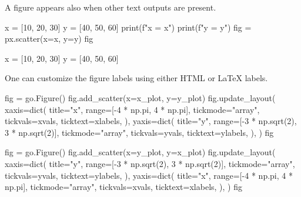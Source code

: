 \documentclass[oneside]{book}
\begin{document}
\begin{mdcell}
A figure appears also when other text outputs are present.
\end{mdcell}

\begin{pycell}
x = [10, 20, 30]
y = [40, 50, 60]
print(f"x = {x}")
print(f"y = {y}")
fig = px.scatter(x=x, y=y)
fig
\end{pycell}
\begin{pyexpectedoutput}
x = [10, 20, 30]
y = [40, 50, 60]
\end{pyexpectedoutput}

\begin{mdcell}
One can customize the figure labels using either HTML or LaTeX labels.
\end{mdcell}


\begin{pycell}
fig = go.Figure()
fig.add_scatter(x=x_plot, y=y_plot)
fig.update_layout(
    xaxis=dict(
        title="x",
        range=[-4 * np.pi, 4 * np.pi],
        tickmode="array",
        tickvals=xvals,
        ticktext=xlabels,
    ),
    yaxis=dict(
        title="y",
        range=[-3 * np.sqrt(2), 3 * np.sqrt(2)],
        tickmode="array",
        tickvals=yvals,
        ticktext=ylabels,
    ),
)
fig
\end{pycell}

\begin{pycell}
fig = go.Figure()
fig.add_scatter(x=y_plot, y=x_plot)
fig.update_layout(
    xaxis=dict(
        title="y",
        range=[-3 * np.sqrt(2), 3 * np.sqrt(2)],
        tickmode="array",
        tickvals=yvals,
        ticktext=ylabels,
    ),
    yaxis=dict(
        title="x",
        range=[-4 * np.pi, 4 * np.pi],
        tickmode="array",
        tickvals=xvals,
        ticktext=xlabels,
    ),
)
fig
\end{pycell}
\end{document}
